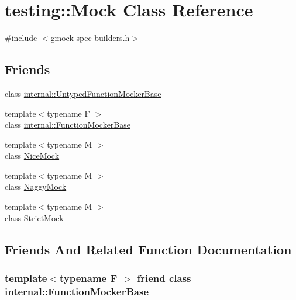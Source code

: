 \hypertarget{classtesting_1_1_mock}{}\section{testing\+:\+:Mock Class Reference}
\label{classtesting_1_1_mock}


{\ttfamily \#include $<$gmock-\/spec-\/builders.\+h$>$}

\subsection*{Friends}
\begin{DoxyCompactItemize}
\item 
class \hyperlink{classtesting_1_1_mock_aa199ba5b2fe114afc42c43912a582feb}{internal\+::\+Untyped\+Function\+Mocker\+Base}
\item 
{\footnotesize template$<$typename F $>$ }\\class \hyperlink{classtesting_1_1_mock_a1945aea400fdb50639e5cdf43c583687}{internal\+::\+Function\+Mocker\+Base}
\item 
{\footnotesize template$<$typename M $>$ }\\class \hyperlink{classtesting_1_1_mock_a9e796f79d4c876398f83aa7678dddc46}{Nice\+Mock}
\item 
{\footnotesize template$<$typename M $>$ }\\class \hyperlink{classtesting_1_1_mock_aee2e427ecb34e6662477add3bb5f8819}{Naggy\+Mock}
\item 
{\footnotesize template$<$typename M $>$ }\\class \hyperlink{classtesting_1_1_mock_a88b3d71476c27b82c88bd49e8297e20e}{Strict\+Mock}
\end{DoxyCompactItemize}


\subsection{Friends And Related Function Documentation}
\subsubsection[{\texorpdfstring{internal\+::\+Function\+Mocker\+Base}{internal::FunctionMockerBase}}]{\setlength{\rightskip}{0pt plus 5cm}template$<$typename F $>$ friend class {\bf internal\+::\+Function\+Mocker\+Base}\hspace{0.3cm}{\ttfamily [friend]}}\hypertarget{classtesting_1_1_mock_a1945aea400fdb50639e5cdf43c583687}{}\label{classtesting_1_1_mock_a1945aea400fdb50639e5cdf43c583687}
